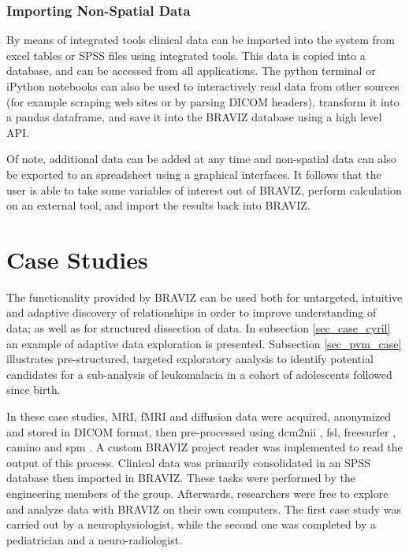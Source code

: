 \documentclass{frontiersHLTH}
\begin{document}
\subsubsection{Importing Non-Spatial Data}

By means of integrated tools clinical data can be imported into the system from excel tables or SPSS files using integrated tools. This data is copied into a database, and can be accessed from all applications. The python terminal or iPython notebooks \cite{perez_ipython:_2007} can also be used to interactively read data from other sources (for example scraping web sites or by parsing DICOM headers), transform it into a pandas dataframe, and save it into the BRAVIZ database using a high level API.

Of note, additional data can be added at any time and non-spatial data can also be exported to an spreadsheet using a graphical interfaces. It follows that the user is able to take some variables of interest out of BRAVIZ, perform calculation on an external tool, and import the results back into BRAVIZ.




\section{Case Studies}
\label{case_studies}
The functionality provided by BRAVIZ can be used both for untargeted, intuitive and adaptive discovery of relationships in order to improve understanding of data; as well as for structured dissection of data. In subsection \ref{sec_case_cyril} an example of adaptive data exploration is presented. Subsection \ref{sec_pvm_case} illustrates pre-structured, targeted exploratory analysis to identify potential candidates for a sub-analysis of leukomalacia in a cohort of adolescents followed since birth. 

In these case studies, MRI, fMRI and diffusion data were acquired, anonymized and stored in DICOM format, then pre-processed using dcm2nii \cite{rorden_mricron_2007}, fsl\cite{jenkinson_fsl_2012}, freesurfer \cite{fischl_freesurfer_2012}, camino\cite{cook_camino:_2006} and spm \cite{friston_statistical_2007}. A custom BRAVIZ project reader was implemented to read the output of this process. 
Clinical data was primarily consolidated in an SPSS database then imported in BRAVIZ. These tasks were performed by the engineering members of the group. Afterwards, researchers were free to explore and analyze data with BRAVIZ on their own computers. The first case study was carried out by a neurophysiologist, while the second one was completed by a  pediatrician and a neuro-radiologist. 
	
\end{document}
